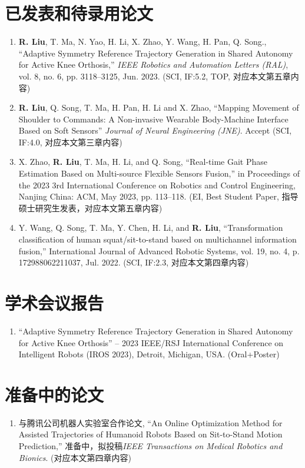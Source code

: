
\begin{publications}

\section*{已发表和待录用论文}

\begin{enumerate}
\item \textbf{R. Liu}, T. Ma, N. Yao, H. Li, X. Zhao, Y. Wang, H. Pan, Q. Song., “Adaptive Symmetry Reference Trajectory Generation in Shared Autonomy for Active Knee Orthosis,” \textit{IEEE Robotics and Automation Letters (RAL)}, vol. 8, no. 6, pp. 3118–3125, Jun. 2023. (SCI, IF:5.2, TOP, 对应本文第五章内容)
\item \textbf{R. Liu}, Q. Song, T. Ma, H. Pan, H. Li and X. Zhao, ``Mapping Movement of Shoulder to Commands: A Non-invasive Wearable Body-Machine Interface Based on Soft Sensors'' \textit{Journal of Neural Engineering (JNE)}. Accept (SCI, IF:4.0, 对应本文第三章内容)
\item X. Zhao, \textbf{R. Liu}, T. Ma, H. Li, and Q. Song, “Real-time Gait Phase Estimation Based on Multi-source Flexible Sensors Fusion,” in Proceedings of the 2023 3rd International Conference on Robotics and Control Engineering, Nanjing China: ACM, May 2023, pp. 113–118. (EI, Best Student Paper, 指导硕士研究生发表，对应本文第五章内容)
\item Y. Wang, Q. Song, T. Ma, Y. Chen, H. Li, and \textbf{R. Liu}, “Transformation classification of human squat/sit-to-stand based on multichannel information fusion,” International Journal of Advanced Robotic Systems, vol. 19, no. 4, p. 172988062211037, Jul. 2022. (SCI, IF:2.3, 对应本文第四章内容)
\end{enumerate}

\section*{学术会议报告}
\begin{enumerate}
\item ``Adaptive Symmetry Reference Trajectory Generation in Shared Autonomy for Active Knee Orthosis'' – 2023 IEEE/RSJ International Conference on Intelligent Robots (IROS 2023), Detroit, Michigan, USA. (Oral+Poster)
\end{enumerate}

\section*{准备中的论文}
\begin{enumerate}
\item 与腾讯公司机器人实验室合作论文, ``An Online Optimization Method for Assisted Trajectories of Humanoid Robots Based on Sit-to-Stand Motion Prediction,'' 准备中，拟投稿\textit{IEEE Transactions on Medical Robotics and Bionics}. (对应本文第四章内容)
\end{enumerate}


\end{publications}
